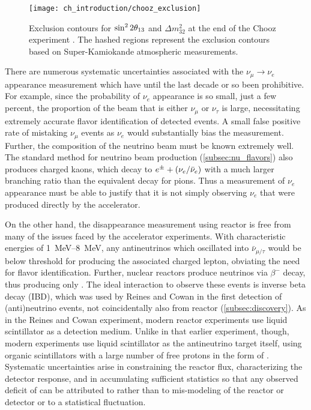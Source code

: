 \begin{figure}
    \centering
    \texttt{[image: ch\_introduction/chooz\_exclusion]}
    \caption[Constraint on \thetaot{} by Chooz]{
        Exclusion contours for $\sin^22\theta_{13}$ and $\Delta m^2_{32}$
        at the end of the Chooz experiment \cite{chooz1999}.
        The hashed regions represent the exclusion contours
        based on Super-Kamiokande atmospheric measurements.
    }
    \label{fig:chooz_exclusion}
\end{figure}


There are numerous systematic uncertainties associated with the $\nu_\mu\to\nu_e$ appearance measurement
which have until the last decade or so been prohibitive.
For example, since the probability of $\nu_e$ appearance is so small,
just a few percent,
the proportion of the beam that is either $\nu_\mu$ or $\nu_\tau$ is large,
necessitating extremely accurate flavor identification of detected events.
A small false positive rate of mistaking $\nu_\mu$ events as $\nu_e$
would substantially bias the measurement.
Further, the composition of the neutrino beam must be known extremely well.
The standard method for neutrino beam production (\cref{subsec:nu_flavors})
also produces charged kaons, which decay to $e^\pm + (\nu_e/\bar{\nu}_e)$
with a much larger branching ratio than the equivalent decay for pions.
Thus a measurement of $\nu_e$ appearance must be able to justify
that it is not simply observing $\nu_e$ that were produced directly
by the accelerator.

On the other hand, the disappearance measurement using reactor \nuebar{} is
free from many of the issues faced by the accelerator experiments.
With characteristic energies of \SIrange{1}{8}{\MeV},
any antineutrinos which oscillated into $\bar{\nu}_{\mu/\tau}$
would be below threshold for producing the associated charged lepton,
obviating the need for flavor identification.
Further, nuclear reactors produce neutrinos via $\beta^-$ decay,
thus producing only \nuebar{}.
The ideal interaction to observe these \nuebar{} events
is inverse beta decay (IBD),
which was used by Reines and Cowan in the first detection of (anti)neutrino events,
not coincidentally also from reactor \nuebar{} (\cref{subsec:discovery}).
As in the Reines and Cowan experiment,
modern reactor \nuebar{} experiments use liquid scintillator
as a detection medium.
Unlike in that earlier experiment, though,
modern experiments use liquid scintillator as the antineutrino target itself,
using organic scintillators with a large number of free protons
in the form of .
Systematic uncertainties arise in constraining the reactor \nuebar{} flux,
characterizing the detector response,
and in accumulating sufficient statistics
so that any observed deficit of \nuebar{}
can be attributed to \thetaot{} rather than to mis-modeling of the reactor
or detector or to a statistical fluctuation.

